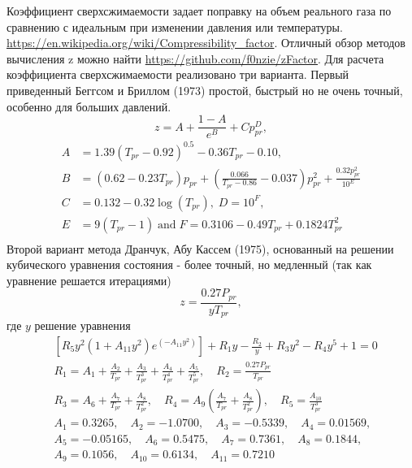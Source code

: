 Коэффициент сверхсжимаемости задает поправку на объем реального газа по сравнению с идеальным при изменении давления или температуры. \url{https://en.wikipedia.org/wiki/Compressibility_factor}. Отличный обзор методов вычисления z можно найти \url{https://github.com/f0nzie/zFactor}.
Для расчета коэффициента сверхсжимаемости реализовано три варианта. Первый приведенный Беггсом и Бриллом (1973) простой, быстрый но не очень точный, особенно для больших давлений.
$$
z = A + \frac{1 - A}{{e^{B} }} + Cp_{pr}^{D} ,
$$
$$
\begin{aligned} A & = 1.39(T_{pr} - 0.92)^{0.5} - 0.36T_{pr} - 0.10, \\ B & = (0.62 - 0.23T_{pr} )p_{pr} + \left( {\frac{0.066}{{T_{pr} - 0.86}} - 0.037} \right)p_{pr}^{2} + \frac{{0.32p_{pr}^{2} }}{{10^{E} }} \\ C & = 0.132 - 0.32\log (T_{pr} ), \;D = 10^{F} , \\ E & = 9(T_{pr} - 1)\;{\text{and}}\; F = 0.3106 - 0.49T_{pr} + 0.1824T_{pr}^{2} \\ \end{aligned}
$$
Второй вариант метода Дранчук, Абу Кассем (1975), основанный на решении кубического уравнения состояния - более точный, но медленный (так как уравнение решается итерациями) 
$$
z = \frac{{0.27P_{pr} }}{{yT_{pr} }},
$$
где $y$ решение уравнения 
$$
\begin{aligned} & \left[ {R_{5} y^{2} (1 + A_{11} y^{2} )e^{{( - A_{11} y^{2} )}} } \right] + R_{1} y - \frac{{R_{2} }}{y} + R_{3} y^{2} - R_{4} y^{5} + 1 = 0 \\ & R_{1} = A_{1} + \frac{{A_{2} }}{{T_{pr} }} + \frac{{A_{3} }}{{T_{pr}^{3} }} + \frac{{A_{4} }}{{T_{pr}^{4} }} + \frac{{A_{5} }}{{T_{pr}^{5} }}, \quad R_{2} = \frac{{0.27P_{pr} }}{{T_{pr} }} \\ & R_{3} = A_{6} + \frac{{A_{7} }}{{T_{pr} }} + \frac{{A_{8} }}{{T_{pr}^{2} }},\quad R_{4} = A_{9} \left( {\frac{{A_{7} }}{{T_{pr} }} + \frac{{A_{8} }}{{T_{pr}^{2} }}} \right), \quad R_{5} = \frac{{A_{10} }}{{T_{pr}^{3} }} \\ & A_{1} = 0.3265, \quad A_{2} = - 1.0700, \quad A_{3} = - 0.5339, \quad A_{4} = 0.01569, \\ & A_{5} = - 0.05165, \quad A_{6} = 0.5475, \quad A_{7} = 0.7361, \quad A_{8} = 0.1844, \\ & A_{9} = 0.1056, \quad A_{10} = 0.6134, \quad A_{11} = 0.7210 \\ \end{aligned}
$$
